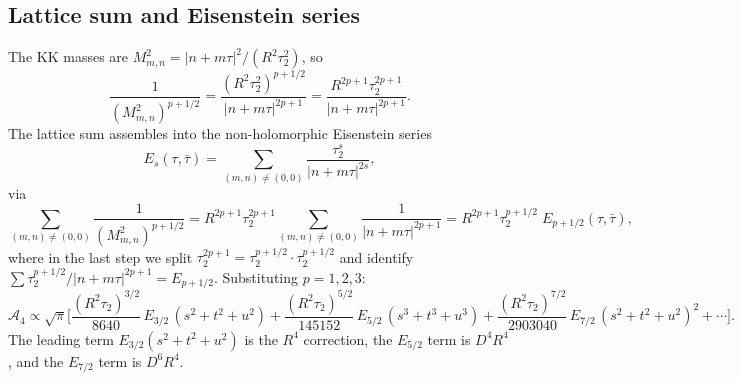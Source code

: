 \subsection{Lattice sum and Eisenstein series}
The KK masses are $M_{m,n}^2 = |n+m\tau|^2/(R^2\tau_2^2)$, so
\begin{equation}
\frac{1}{(M_{m,n}^2)^{p+1/2}}
=\frac{(R^2\tau_2^2)^{p+1/2}}{|n+m\tau|^{2p+1}}
=\frac{R^{2p+1}\tau_2^{2p+1}}{|n+m\tau|^{2p+1}}.
\end{equation}
The lattice sum assembles into the non-holomorphic Eisenstein series
\begin{equation}
E_s(\tau,\bar\tau) = \sum_{(m,n)\neq(0,0)}\frac{\tau_2^s}{|n+m\tau|^{2s}},
\end{equation}
via
\begin{equation}
\sum_{(m,n)\neq(0,0)} \frac{1}{(M_{m,n}^2)^{p+1/2}}
= R^{2p+1}\tau_2^{2p+1}\sum_{(m,n)\neq(0,0)}\frac{1}{|n+m\tau|^{2p+1}}
= R^{2p+1}\tau_2^{p+1/2}\; E_{p+1/2}(\tau,\bar\tau),
\end{equation}
where in the last step we split $\tau_2^{2p+1} = \tau_2^{p+1/2}\cdot\tau_2^{p+1/2}$ and identify $\sum\tau_2^{p+1/2}/|n+m\tau|^{2p+1} = E_{p+1/2}$.
Substituting $p=1,2,3$:
\begin{equation}
\boxed{
\mathcal{A}_4
\propto \sqrt\pi\Bigg[
\frac{(R^2\tau_2)^{3/2}}{8640}\,E_{3/2}\,(s^2+t^2+u^2)
+\frac{(R^2\tau_2)^{5/2}}{145152}\,E_{5/2}\,(s^3+t^3+u^3)
+\frac{(R^2\tau_2)^{7/2}}{2903040}\,E_{7/2}\,(s^2+t^2+u^2)^2
+\cdots
\Bigg].
}
\end{equation}
The leading term $E_{3/2}(s^2+t^2+u^2)$ is the $R^4$ correction, the $E_{5/2}$ term is $D^4R^4$, and the $E_{7/2}$ term is $D^6R^4$.